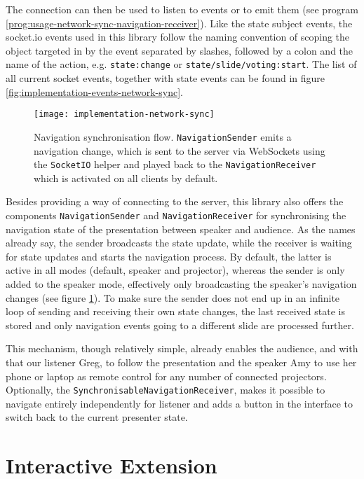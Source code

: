 The connection can then be used to listen to events or to emit them (see program \ref{prog:usage-network-sync-navigation-receiver}). Like the state subject events, the socket.io events used in this library follow the naming convention of scoping the object targeted in by the event separated by slashes, followed by a colon and the name of the action, e.g. \texttt{state:change} or \texttt{state/slide/voting:start}. The list of all current socket events, together with state events can be found in figure \ref{fig:implementation-events-network-sync}.

\begin{figure}
\centering
\texttt{[image: implementation-network-sync]}
\caption{Navigation synchronisation flow. \texttt{NavigationSender} emits a navigation change, which is sent to the server via WebSockets using the \texttt{SocketIO} helper and played back to the \texttt{NavigationReceiver} which is activated on all clients by default.}
\label{fig:implementation-network-sync}
\end{figure}

Besides providing a way of connecting to the server, this library also offers the components \texttt{NavigationSender} and \texttt{NavigationReceiver} for synchronising the navigation state of the presentation between speaker and audience. As the names already say, the sender broadcasts the state update, while the receiver is waiting for state updates and starts the navigation process. By default, the latter is active in all modes (default, speaker and projector), whereas the sender is only added to the speaker mode, effectively only broadcasting the speaker's navigation changes (see figure \ref{fig:implementation-network-sync}). To make sure the sender does not end up in an infinite loop of sending and receiving their own state changes, the last received state is stored and only navigation events going to a different slide are processed further.

This mechanism, though relatively simple, already enables the audience, and with that our listener Greg, to follow the presentation and the speaker Amy to use her phone or laptop as remote control for any number of connected projectors. Optionally, the \texttt{SynchronisableNavigationReceiver}, makes it possible to navigate entirely independently for listener and adds a button in the interface to switch back to the current presenter state.

\section{Interactive Extension}
\label{sec:implementation-interactive}

